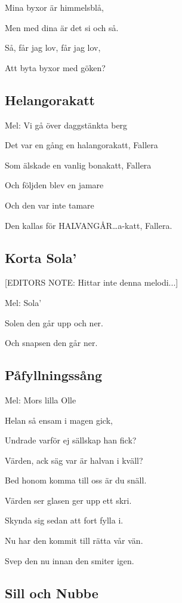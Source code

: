 Mina byxor är himmelsblå,

Men med dina är det si och så.

Så, får jag lov, får jag lov,

Att byta byxor med göken?

\subsection{\textbf{Helangorakatt}}

Mel: Vi gå över daggstänkta berg\bigskip

Det var en gång en halangorakatt, Fallera

Som älskade en vanlig bonakatt, Fallera

Och följden blev en jamare

Och den var inte tamare

Den kallas för HALVANGÅR…a-katt, Fallera.

\subsection{\textbf{Korta Sola’}}

[EDITORS NOTE: Hittar inte denna melodi...]

Mel: Sola’\bigskip

Solen den går upp och ner.

Och snapsen den går ner.

\subsection{\textbf{Påfyllningssång}}

Mel: Mors lilla Olle\bigskip

Helan så ensam i magen gick,

Undrade varför ej sällskap han fick?

Värden, ack säg var är halvan i kväll?

Bed honom komma till oss är du snäll.\bigskip

Värden ser glasen ger upp ett skri.

Skynda sig sedan att fort fylla i.

Nu har den kommit till rätta vår vän.

Svep den nu innan den smiter igen.

\subsection{\textbf{Sill och Nubbe}}

